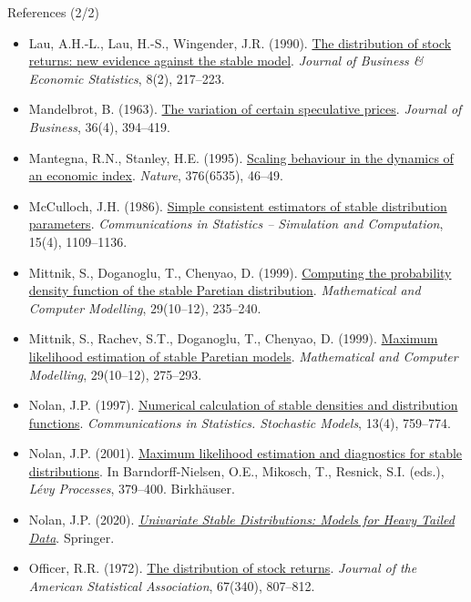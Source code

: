 \begin{frame}{References (2/2)}
\itemsize{\tiny}
\begin{itemize}
    \item Lau, A.H.-L., Lau, H.-S., Wingender, J.R. (1990). \href{https://doi.org/10.1080/07350015.1990.10509793}{The distribution of stock returns: new evidence against the stable model}. \textit{Journal of Business \& Economic Statistics}, 8(2), 217--223.
    \item Mandelbrot, B. (1963). \href{https://doi.org/10.1086/294632}{The variation of certain speculative prices}. \textit{Journal of Business}, 36(4), 394--419.
    \item Mantegna, R.N., Stanley, H.E. (1995). \href{https://doi.org/10.1038/376046a0}{Scaling behaviour in the dynamics of an economic index}. \textit{Nature}, 376(6535), 46--49.
    \item McCulloch, J.H. (1986). \href{https://doi.org/10.1080/03610918608812563}{Simple consistent estimators of stable distribution parameters}. \textit{Communications in Statistics -- Simulation and Computation}, 15(4), 1109--1136.
    \item Mittnik, S., Doganoglu, T., Chenyao, D. (1999). \href{https://doi.org/10.1016/S0895-7177(99)00106-5}{Computing the probability density function of the stable Paretian distribution}. \textit{Mathematical and Computer Modelling}, 29(10--12), 235--240.
    \item Mittnik, S., Rachev, S.T., Doganoglu, T., Chenyao, D. (1999). \href{https://doi.org/10.1016/S0895-7177(99)00110-7}{Maximum likelihood estimation of stable Paretian models}. \textit{Mathematical and Computer Modelling}, 29(10--12), 275--293.
    \item Nolan, J.P. (1997). \href{https://doi.org/10.1080/15326349708807450}{Numerical calculation of stable densities and distribution functions}. \textit{Communications in Statistics. Stochastic Models}, 13(4), 759--774.
    \item Nolan, J.P. (2001). \href{https://doi.org/10.1007/978-1-4612-0197-7_17}{Maximum likelihood estimation and diagnostics for stable distributions}. In Barndorff-Nielsen, O.E., Mikosch, T., Resnick, S.I. (eds.), \textit{Lévy Processes}, 379--400. Birkhäuser.
    \item Nolan, J.P. (2020). \href{https://doi.org/10.1007/978-3-030-52915-4}{\textit{Univariate Stable Distributions: Models for Heavy Tailed Data}}. Springer.
    \item Officer, R.R. (1972). \href{https://doi.org/10.1080/01621459.1972.10481297}{The distribution of stock returns}. \textit{Journal of the American Statistical Association}, 67(340), 807--812.

\end{itemize}
\end{frame}
